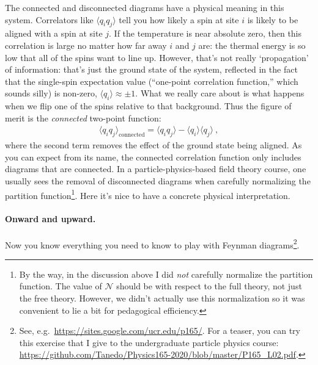 The connected and disconnected diagrams have a physical meaning in this system. Correlators like $\langle q_iq_j\rangle$ tell you how likely a spin at site $i$ is likely to be aligned with a spin at site $j$. If the temperature is near absolute zero, then this correlation is large no matter how far away $i$ and $j$ are: the thermal energy is so low that all of the spins want to line up. However, that's not really `propagation' of information: that's just the ground state of the system, reflected in the fact that the single-spin expectation value (``one-point correlation function,'' which sounds silly) is non-zero, $\langle q_i\rangle \approx \pm 1$. What we really care about is what happens when we flip one of the spins relative to that background. Thus the figure of merit is the \emph{connected} two-point function:
\begin{align}
	\langle q_i q_j\rangle_\text{connected} = \langle q_i q_j\rangle 
	- \langle q_i\rangle\langle q_j\rangle \ ,
\end{align}
where the second term removes the effect of the ground state being aligned. As you can expect from its name, the connected correlation function only includes diagrams that are connected. In a particle-physics-based field theory course, one usually sees the removal of disconnected diagrams when carefully normalizing the partition function\footnote{By the way, in the discussion above I did \emph{not} carefully normalize the partition function. The value of $\mathcal N$ should be with respect to the full theory, not just the free theory. However, we didn't actually use this normalization so it was convenient to lie a bit for pedagogical efficiency.}. Here it's nice to have a concrete physical interpretation.


\paragraph{Onward and upward.}
Now you know everything you need to know to play with Feynman diagrams\footnote{See, e.g.~\url{https://sites.google.com/ucr.edu/p165/}. For a teaser, you can try this exercise that I give to the undergraduate particle physics course: \url{https://github.com/Tanedo/Physics165-2020/blob/master/P165_L02.pdf}.}.








 















